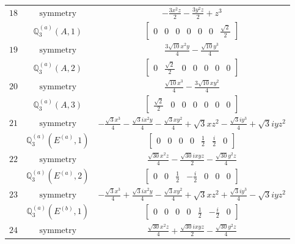 \documentclass[fleqn,8pt,landscape]{jsarticle}
\begin{document}
\begin{longtable}{ccc}
$ 18 $ & $ \text{symmetry} $ & $ - \frac{3 x^{2} z}{2} - \frac{3 y^{2} z}{2} + z^{3} $ \\
$  $ & $ \mathbb{Q}_{3}^{(a)}(A,1) $ & $ \begin{bmatrix} 0 & 0 & 0 & 0 & 0 & 0 & \frac{\sqrt{2}}{2} \end{bmatrix} $ \\ \hline
$ 19 $ & $ \text{symmetry} $ & $ \frac{3 \sqrt{10} x^{2} y}{4} - \frac{\sqrt{10} y^{3}}{4} $ \\
$  $ & $ \mathbb{Q}_{3}^{(a)}(A,2) $ & $ \begin{bmatrix} 0 & \frac{\sqrt{2}}{2} & 0 & 0 & 0 & 0 & 0 \end{bmatrix} $ \\ \hline
$ 20 $ & $ \text{symmetry} $ & $ \frac{\sqrt{10} x^{3}}{4} - \frac{3 \sqrt{10} x y^{2}}{4} $ \\
$  $ & $ \mathbb{Q}_{3}^{(a)}(A,3) $ & $ \begin{bmatrix} \frac{\sqrt{2}}{2} & 0 & 0 & 0 & 0 & 0 & 0 \end{bmatrix} $ \\ \hline
$ 21 $ & $ \text{symmetry} $ & $ - \frac{\sqrt{3} x^{3}}{4} - \frac{\sqrt{3} i x^{2} y}{4} - \frac{\sqrt{3} x y^{2}}{4} + \sqrt{3} x z^{2} - \frac{\sqrt{3} i y^{3}}{4} + \sqrt{3} i y z^{2} $ \\
$  $ & $ \mathbb{Q}_{3}^{(a)}(E^{(a)},1) $ & $ \begin{bmatrix} 0 & 0 & 0 & 0 & \frac{1}{2} & \frac{i}{2} & 0 \end{bmatrix} $ \\ \hline
$ 22 $ & $ \text{symmetry} $ & $ \frac{\sqrt{30} x^{2} z}{4} - \frac{\sqrt{30} i x y z}{2} - \frac{\sqrt{30} y^{2} z}{4} $ \\
$  $ & $ \mathbb{Q}_{3}^{(a)}(E^{(a)},2) $ & $ \begin{bmatrix} 0 & 0 & \frac{1}{2} & - \frac{i}{2} & 0 & 0 & 0 \end{bmatrix} $ \\ \hline
$ 23 $ & $ \text{symmetry} $ & $ - \frac{\sqrt{3} x^{3}}{4} + \frac{\sqrt{3} i x^{2} y}{4} - \frac{\sqrt{3} x y^{2}}{4} + \sqrt{3} x z^{2} + \frac{\sqrt{3} i y^{3}}{4} - \sqrt{3} i y z^{2} $ \\
$  $ & $ \mathbb{Q}_{3}^{(a)}(E^{(b)},1) $ & $ \begin{bmatrix} 0 & 0 & 0 & 0 & \frac{1}{2} & - \frac{i}{2} & 0 \end{bmatrix} $ \\ \hline
$ 24 $ & $ \text{symmetry} $ & $ \frac{\sqrt{30} x^{2} z}{4} + \frac{\sqrt{30} i x y z}{2} - \frac{\sqrt{30} y^{2} z}{4} $ \\

\end{longtable}
\end{document}
